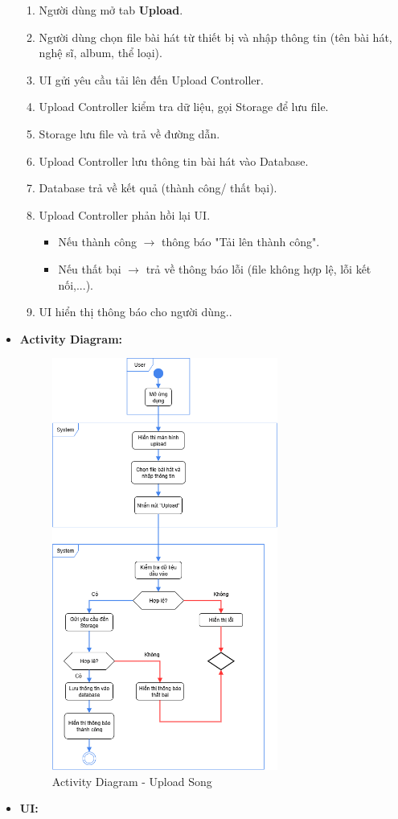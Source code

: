 \documentclass[a4paper]{article}
\begin{document}
\begin{itemize}
\begin{enumerate}
			\item Người dùng mở tab \textbf{Upload}.
			\item Người dùng chọn file bài hát từ thiết bị và nhập thông tin (tên bài hát, nghệ sĩ, album, thể loại).
			\item UI gửi yêu cầu tải lên đến Upload Controller.
			\item Upload Controller kiểm tra dữ liệu, gọi Storage để lưu file.
			\item Storage lưu file và trả về đường dẫn.
			\item Upload Controller lưu thông tin bài hát vào Database.
			\item Database trả về kết quả (thành công/ thất bại).
			\item Upload Controller phản hồi lại UI.
			\begin{itemize}
				\item Nếu thành công $\rightarrow$ thông báo "Tải lên thành công".
				\item Nếu thất bại $\rightarrow$ trả về thông báo lỗi (file không hợp lệ, lỗi kết nối,...).
			\end{itemize}
			\item UI hiển thị thông báo cho người dùng..
		  \end{enumerate}
	\item \textbf{Activity Diagram:}
		\begin{figure}[H]
				\centering
				\includegraphics[width=0.7\textwidth]{Images/upload_activity.png}
				\caption{Activity Diagram - Upload Song}
	      \end{figure}
	\item \textbf{UI:}
\end{itemize}
\end{document}
